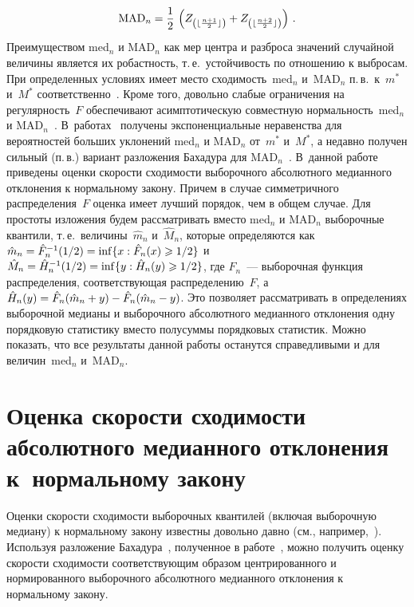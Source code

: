\begin{multicols}{2}
\noindent
$$
\mathrm{MAD}_n=\displaystyle\frac{\displaystyle 1\mathstrut}{\displaystyle 2\mathstrut}\,\left(Z_{\left(\lfloor\frac{n+1}{2}\rfloor\right)}+
Z_{\left(\lfloor\frac{n+2}{2}\rfloor\right)}\right)\,.
$$
Преимуществом med$_n$ и MAD$_n$ как мер центра и разброса значений
случайной величины является их робастность, т.\,е.\ устойчивость по
отношению к выбросам. При определенных условиях имеет место
сходимость~med$_n$ и~MAD$_n$ п.\,в.\ к~$m^*$ и~$M^*$
соответственно~\cite{1-sh, 3-sh}. Кроме того, довольно слабые ограничения на
регулярность~$F$ обеспечивают асимптотическую совместную
нормальность~med$_n$ и MAD$_n$~\cite{2-sh}. В~работах~\cite{3-sh, 5-sh} получены
экспоненциальные неравенства для вероятностей больших уклонений
med$_n$ и MAD$_n$ от~$m^*$ и~$M^*$, а недавно получен сильный (п.\,в.) 
вариант разложения Бахадура для MAD$_n$~\cite{4-sh}. В~данной работе
приведены оценки скорости сходимости выборочного абсолютного
медианного отклонения к нормальному закону. Причем в случае
симметричного распределения~$F$ оценка имеет лучший порядок, чем в
общем случае. Для простоты изложения будем рассматривать вместо
med$_n$ и MAD$_n$ выборочные квантили, т.\,е.\ величины~$\hat{m}_n$ и~$\hat{M}_n$, 
которые определяются как
$\hat{m}_n\hm=\hat{F}_n^{-1}(1/2)\hm=\inf\{x:\hat{F}_n(x)\hm\geqslant1/2\}$ и
$\hat{M}_n\hm=\hat{H}_n^{-1}(1/2)\hm=\inf\{y:\hat{H}_n(y)\hm\geqslant1/2\}$,
где $\hat{F}_n$~--- выборочная функция распределения, соответствующая
распределению~$F$, а
$\hat{H}_n(y)\hm=\hat{F}_n(\hat{m}_n+y)\hm-\hat{F}_n(\hat{m}_n-y)$. Это
позволяет рассматривать в определениях выборочной медианы и
выборочного абсолютного медианного отклонения одну порядковую
статистику вместо полусуммы порядковых статистик. Можно показать,
что все результаты данной работы останутся справедливыми и для
величин~med$_n$ и~MAD$_n$.

\pagebreak

\section{Оценка скорости сходимости абсолютного медианного отклонения к~нормальному закону}

Оценки скорости сходимости выборочных квантилей (включая выборочную медиану) 
к нормальному закону известны довольно давно (см., например,~\cite{5-sh, 7-sh}). 
Используя разложение Бахадура~\cite{6-sh}, полученное в работе~\cite{4-sh}, 
можно получить оценку скорости сходимости соот\-вет\-ст\-ву\-ющим образом центрированного 
и нормированного выборочного абсолютного медианного отклонения к нормальному закону.


\end{multicols}
